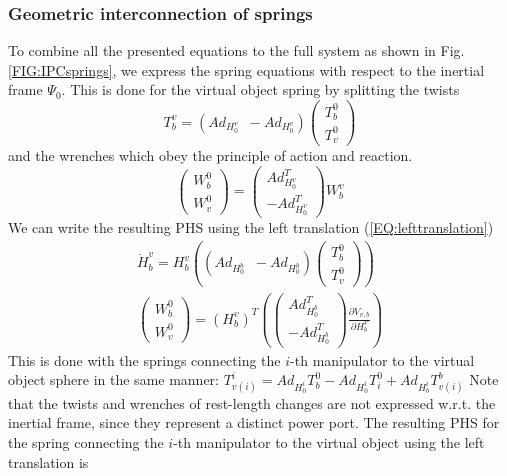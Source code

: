 \documentclass[a4paper,twoside, openright,12pt]{report}
\begin{document}
\subsubsection{Geometric interconnection of springs}
To combine all the presented equations to the full system as shown in Fig. \ref{FIG:IPCsprings}, we express the spring equations with respect to the inertial frame $\Psi_0$.
This is done for the virtual object spring by splitting the twists
\[T_b^v = (Ad_{H_0^v} \;\; -Ad_{H_0^v}) \begin{pmatrix} T_b^0 \\ T_v^0 \end{pmatrix}  \]
and the wrenches which obey the principle of action and reaction.
\[ \begin{pmatrix}W_b^{0} \\ W_v^{0}\end{pmatrix}  = 
\begin{pmatrix}Ad_{H_0^v}^T \\ -Ad_{H_0^v}^T \end{pmatrix} W_b^{v} \]
We can write the resulting PHS using the left translation (\ref{EQ:lefttranslation})
\begin{eqnarray}
	\dot{H}_b^v = H_b^v \left( (Ad_{H_0^b} \;\; -Ad_{H_0^b}) \begin{pmatrix} T_b^0 \\ T_v^0 \end{pmatrix}\right)   \\
	\begin{pmatrix}W_b^{0} \\ W_v^{0}\end{pmatrix}  = (H_b^v)^T \left(
	\begin{pmatrix}Ad_{H_0^b}^T \\ -Ad_{H_0^b}^T \end{pmatrix}
	\frac{\partial V_{v,b}}{\partial H_b^v} \right) 
\end{eqnarray} 
This is done with the springs connecting the $i$-th manipulator to the virtual object sphere in the same manner:
$T_{v(i)}^i = Ad_{H_0^i} T_b^0 - Ad_{H_0^i} T_i^0 + Ad_{H_b^i} T_{v(i)}^b $ Note that the twists and wrenches of rest-length changes are not expressed w.r.t. the inertial frame, since they represent a distinct power port. The resulting PHS for the spring connecting the $i$-th manipulator to the virtual object using the left translation is
\end{document}
